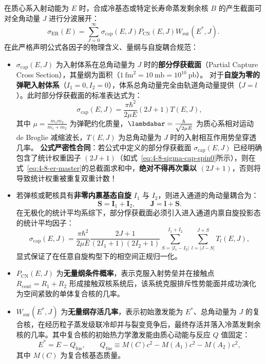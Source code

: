在质心系入射动能为 $E$ 时，合成冷基态或特定长寿命蒸发剩余核 $B$ 的产生截面可对全角动量 $J$ 进行分波展开：
\begin{equation}\label{eq:4-8-er-master}
\sigma_{\mathrm{ER}}(E) = \sum_{J=0}^\infty \sigma_{\mathrm{cap}}(E, J) P_{\mathrm{CN}}(E, J) W_{\mathrm{sur}}(E^*, J).
\end{equation}
在此严格声明公式各因子的物理含义、量纲与自旋耦合规范：
\begin{itemize}
\item $\sigma_{\mathrm{cap}}(E, J)$ 为入射体系在总角动量为 $J$ 时的\textbf{部分俘获截面}（Partial Capture Cross Section），其量纲为面积（$1\ \mathrm{fm}^2 = 10\ \mathrm{mb} = 10^{10}\ \mathrm{pb}$）。
对于\textbf{自旋为零的弹靶入射体系}（$I_1 = 0, I_2 = 0$），体系总角动量完全由轨道角动量提供（$J = l$）。此时部分俘获截面的标准表达式为：
\begin{equation}\label{eq:4-8-sigma-cap-spin0}
\sigma_{\mathrm{cap}}(E, J) = \frac{\pi \hbar^2}{2\mu E} (2J + 1) T(E, J),
\end{equation}
其中 $\mu = \frac{m_1 m_2}{m_1 + m_2}$ 为弹靶约化质量，$\lambdabar = \frac{\hbar}{\sqrt{2\mu E}}$ 为质心系相对运动 de Broglie 减缩波长，$T(E, J)$ 为总角动量为 $J$ 时的入射相互作用势垒穿透几率。
\textbf{公式严密性合同}：若公式中定义的部分俘获截面 $\sigma_{\mathrm{cap}}(E, J)$ 已经明确包含了统计权重因子 $(2J + 1)$（如式~\eqref{eq:4-8-sigma-cap-spin0}所示），则在式~\eqref{eq:4-8-er-master}的总截面求和中，\textbf{绝对不得再次乘以 $(2J+1)$}，否则将导致统计权重被重复双重计数！
\item 若弹核或靶核具有\textbf{非零内禀基态自旋} $I_1$ 与 $I_2$，则进入通道的角动量耦合为：
\begin{equation}\label{eq:4-8-spin-coupling-detail}
\mathbf{S} = \mathbf{I}_1 + \mathbf{I}_2, \qquad \mathbf{J} = \mathbf{l} + \mathbf{S}.
\end{equation}
在无极化的统计平均系综下，部分俘获截面必须引入进入通道内禀自旋投影态的统计平均因子：
\begin{equation}\label{eq:4-8-sigma-cap-general-spin}
\sigma_{\mathrm{cap}}(E, J) = \frac{\pi \hbar^2}{2\mu E} \frac{2J + 1}{(2I_1 + 1)(2I_2 + 1)} \sum_{S=|I_1 - I_2|}^{I_1 + I_2} \sum_{l=|J-S|}^{J+S} T_l(E, J),
\end{equation}
显式保证了在任意自旋构型下的相空间正规归一化。
\item $P_{\mathrm{CN}}(E, J)$ 为\textbf{无量纲条件概率}，表示克服入射势垒并在接触点 $R_{\mathrm{cont}} = R_1 + R_2$ 形成接触双核系统后，该系统克服排斥性势能面并成功演化为空间紧致的单体复合核的几率。
\item $W_{\mathrm{sur}}(E^*, J)$ 为\textbf{无量纲存活几率}，表示初始激发能为 $E^*$、总角动量为 $J$ 的复合核，在经历粒子蒸发级联冷却并与裂变竞争后，最终存活并落入冷蒸发剩余核的几率。其中复合核的初始热力学激发能由质心动能与反应 $Q$ 值固定：
\begin{equation}\label{eq:4-8-excitation-energy-def}
E^* = E - Q_{\mathrm{fus}}, \qquad Q_{\mathrm{fus}} \equiv M(C)c^2 - M(A_1)c^2 - M(A_2)c^2,
\end{equation}
其中 $M(C)$ 为复合核基态质量。
\end{itemize}

